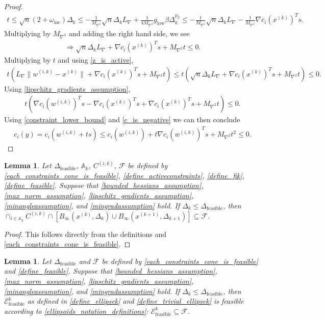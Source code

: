 \documentclass{article}
\newtheorem{lemma}[theorem]{Lemma}
\theoremstyle{case}
\numberwithin{theorem}{subsection}
\newcommand{\activeconstraintsk}{{\mathbb A_{k}}}
\newcommand{\dfeas}{{\Delta_{\textrm{feasible}}}}
\newcommand{\dk}{\Delta_k}
\newcommand{\dkpo}{\Delta_{k+1}}
\newcommand{\feasible}{{\mathcal F}}
\newcommand{\lipgrad}{{L_{\nabla}}}
\newcommand{\maxhessian}{{M_{\nabla^2}}}
\newcommand{\mingrad}{{ g_{\textrm{low}} }}
\newcommand{\omegainc}{\omega_{\text{inc}}}
\newcommand{\tr}{{ B_{\infty}\left(\xk, \dk\right) }}
\newcommand{\trkpo}{{ B_{\infty}\left(\xkpo, \dkpo\right) }}
\newcommand{\unshiftedellipsoid}{{\mathcal E^k_{\textrm{feasible}}}}
\newcommand{\wik}{{w^{(i, k)}}}
\newcommand{\xkpo}{{{x}^{(k+1)}}}
\newcommand{\xk}{x^{(k)}}
\newcommand{\fik}{{C^{(i, k)}}}
\begin{document}
\begin{proof}
\begin{align*}
t 
\le \sqrt{n} \left(2 + \omegainc \right) \dk 
\le -\frac 1 \maxhessian \sqrt{n}\dk \lipgrad + \frac 1 {4\maxhessian} \mingrad \beta \dk^{p_{\beta}}
\le -\frac 1 \maxhessian \sqrt{n}\dk \lipgrad -\frac 1 \maxhessian \nabla c_i(\xk)^Ts.
\end{align*}
Multiplying by $\maxhessian$ and adding the right hand side, we see
\begin{align*}
\Longrightarrow \sqrt{n}\dk \lipgrad + \nabla c_i(\xk)^Ts + \maxhessian t \le 0.
\end{align*}
Multiplying by $t$ and using \cref{z_is_active},
\begin{align*}
 t \left(\lipgrad\|\wik - \xk\| + \nabla c_i(\xk)^Ts + \maxhessian t\right) \le t \left(\sqrt{n}\dk \lipgrad + \nabla c_i(\xk)^Ts + \maxhessian t\right) \le 0.
\end{align*}
Using \cref{lipschitz_gradients_assumption},
\begin{align*}
t \left(\nabla c_i(\wik)^Ts - \nabla c_i(\xk)^Ts + \nabla c_i(\xk)^Ts + \maxhessian t\right) \le 0.
\end{align*}
Using \cref{constraint_lower_bound} and \cref{c_is_negative} we can then conclude
\begin{align*}
c_i(y) = c_i(\wik + ts) \le c_i(\wik) + t\nabla c_i(\wik)^Ts + \maxhessian t^2 \le 0.
\end{align*}

\end{proof}




\begin{lemma}
\label{cone_and_tr_are_feasible}
Let $\dfeas$, $\activeconstraintsk$, $\fik$, $\feasible$
be defined by
\cref{each_constraints_cone_is_feasible},
\cref{define_activeconstraints},
\cref{define_fik},
\cref{define_feasible}.
Suppose that 
\cref{bounded_hessians_assumption},
\cref{max_norm_assumption},
\cref{lipschitz_gradients_assumption},
\cref{minangleassumption},
and \cref{mingradassumption} hold.
If $\dk \le \dfeas$, then $\cap_{i \in \activeconstraintsk} \fik \cap \left[\tr \cup \trkpo\right] \subseteq \feasible$.
\end{lemma}


\begin{proof}
This follows directly from the definitions and \cref{each_constraints_cone_is_feasible}.
\end{proof}


\begin{lemma}
\label{ellipsoid_is_feasible}
Let $\dfeas$ and $\feasible$
be defined by
\cref{each_constraints_cone_is_feasible} and
\cref{define_feasible}.
Suppose that 
\cref{bounded_hessians_assumption},
\cref{max_norm_assumption},
\cref{lipschitz_gradients_assumption},
\cref{minangleassumption},
and \cref{mingradassumption} hold.
If $\dk \le \dfeas$, then $\unshiftedellipsoid$ as defined in \cref{define_ellipsek} and \cref{define_trivial_ellipsek} is feasible according to 
\cref{ellipsoids_notation_definitions}:
$\unshiftedellipsoid \subseteq \feasible$.
\end{lemma}
\end{document}
